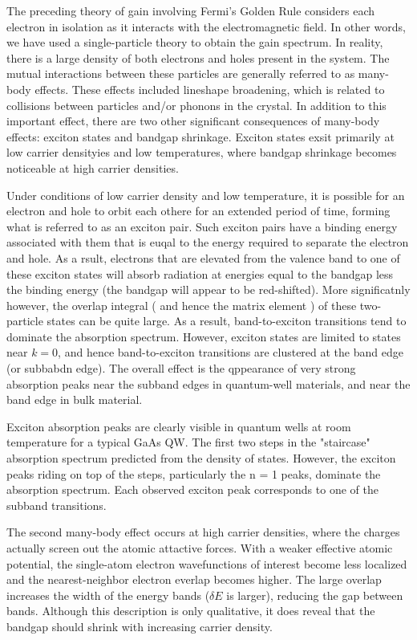 The preceding theory of gain involving Fermi's Golden Rule considers each
electron in isolation as it interacts with the electromagnetic field. In other
words, we have used a single-particle theory to obtain the gain spectrum. In
reality, there is a large density of both electrons and holes present in the
system. The mutual interactions between these particles are generally referred
to as many-body effects. These effects included lineshape broadening, which is
related to collisions between particles and/or phonons in the crystal. In
addition to this important effect, there are two other significant consequences
of many-body effects: exciton states and bandgap shrinkage. Exciton states
exsit primarily at low carrier densityies and low temperatures, where bandgap
shrinkage becomes noticeable at high carrier densities.

Under conditions of low carrier density and low temperature, it is possible for
an electron and hole to orbit each othere for an extended period of time,
forming what is referred to as an exciton pair. Such exciton pairs have a
binding energy associated with them that is euqal to the energy required to
separate the electron and hole. As a rsult, electrons that are elevated from
the valence band to one of these exciton states will absorb radiation at
energies equal to the bandgap less the binding energy (the bandgap will appear
to be red-shifted). More significatnly however, the overlap integral ( and
hence the matrix element ) of these two-particle states can be quite large. As
a result, band-to-exciton transitions tend to dominate the absorption spectrum.
However, exciton states are limited to states near $k = 0$, and hence
band-to-exciton transitions are clustered at the band edge (or subbabdn edge).
The overall effect is the qppearance of very strong absorption peaks near the
subband edges in quantum-well materials, and near the band edge in bulk
material.

Exciton absorption peaks are clearly visible in quantum wells at room
temperature for a typical GaAs QW. The first two steps in the "staircase"
absorption spectrum predicted from the density of states. However, the exciton
peaks riding on top of the steps, particularly the n = 1 peaks, dominate the
absorption spectrum. Each observed exciton peak corresponds to one of the
subband transitions.

The second many-body effect occurs at high carrier densities, where the charges
actually screen out the atomic attactive forces. With a weaker effective atomic
potential, the single-atom electron wavefunctions of interest become less
localized and the nearest-neighbor electron everlap becomes higher.  The large
overlap increases the width of the energy bands ($\delta{E}$ is larger),
reducing the gap between bands. Although this description is only qualitative,
it does reveal that the bandgap should shrink with increasing carrier density.

